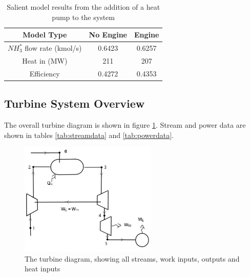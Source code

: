\documentclass[11pt, oneside]{article}
\begin{document}
\begin {table} [h]
\begin{center}
\caption{Salient model results from the addition of a heat pump to the system} \label{tab:heatengine} 
\begin{tabular}{ |c|c|c| }
 \hline
  Model Type & No Engine & Engine\\ 
  \hline
  $NH_3^*$ flow rate (kmol/s) & 0.6423 & 0.6257\\ 
 \hline
  Heat in (MW) & 211& 207\\
  \hline
  Efficiency & 0.4272 & 0.4353\\
 \hline
\end{tabular}
\end{center}  
\end {table}

\pagebreak
\subsection{Turbine System Overview}
The overall turbine diagram is shown in figure \ref{fig:turbinediagram}. Stream and power data are shown in tables \ref{tab:streamdata} and \ref{tab:powerdata}.

\begin{figure} [h]
\centering
\includegraphics[width=0.58\textwidth]{./pictures/plantdiagram.png}
  \caption{The turbine diagram, showing all streams, work inputs, outputs and heat inputs} \label{fig:turbinediagram}
  \end{figure}
  
\end{document}
